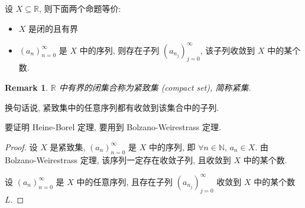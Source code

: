\documentclass[UTF8]{ctexart}
\theoremstyle{mystyle}
\theoremstyle{myremark}
\newtheorem*{remark}{Remark}
\theoremstyle{plain}
\newcommand{\R}{\mathbb R}
\newcommand{\N}{\mathbb N}
\begin{document}
\begin{theorem}
    设 $ X \subseteq \R $, 则下面两个命题等价:
    \begin{itemize}
        \item $ X $ 是闭的且有界
        \item $ (a_n)_{n = 0}^\infty $ 是 $ X $ 中的序列, 则存在子列 $ (a_{n_j})_{j = 0}^\infty $, 该子列收敛到 $ X $ 中的某个数.
    \end{itemize}
\end{theorem}

\begin{remark}
    $ \R $ 中有界的闭集合称为紧致集 (compact set), 简称紧集.
\end{remark}

换句话说, 紧致集中的任意序列都有收敛到该集合中的子列.

要证明 Heine-Borel 定理, 要用到 Bolzano-Weirestrass 定理.

\begin{proof}
    设 $ X $ 是紧致集, $ (a_n)_{n = 0}^\infty $ 是 $ X $ 中的序列, 即 $ \forall n \in \N $, $ a_n \in X $. 由 Bolzano-Weirestrass 定理, 该序列一定存在收敛子列, 且收敛到 $ X $ 中的某个数.

    设 $ (a_n)_{n = 0}^\infty $ 是 $ X $ 中的任意序列, 且存在子列 $ (a_{n_j})_{j = 0}^\infty $ 收敛到 $ X $ 中的某个数 $ L $.
\end{proof}
\end{document}
